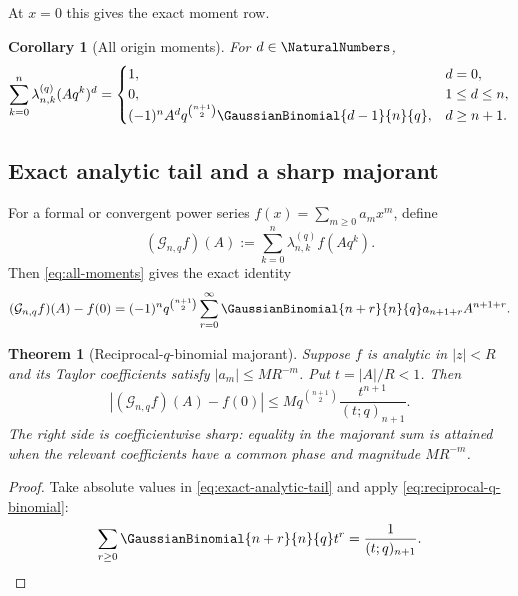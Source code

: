 \documentclass[11pt,oneside]{article}
\numberwithin{equation}{section}
\newtheorem{theorem}{Theorem}[section]
\newtheorem{corollary}[corollary]{Corollary}
\theoremstyle{definition}
\theoremstyle{remark}
\newcommand{\Gc}{\mathcal G}
\begin{document}
At $x=0$ this gives the exact moment row.

\begin{corollary}[All origin moments]
For $d\in\NaturalNumbers$,
\begin{equation}
 \sum_{k=0}^n\lambda_{n,k}^{(q)}(Aq^k)^d
 =\begin{cases}
  1,&d=0,\\
  0,&1\le d\le n,\\
  (-1)^nA^dq^{\binom{n+1}{2}}
  \GaussianBinomial{d-1}{n}{q},&d\ge n+1.
 \end{cases}
 \label{eq:all-moments}
\end{equation}
\end{corollary}

\subsection{Exact analytic tail and a sharp majorant}

For a formal or convergent power series $f(x)=\sum_{m\ge0}a_mx^m$, define
\begin{equation}
 (\Gc_{n,q}f)(A):=\sum_{k=0}^n\lambda_{n,k}^{(q)}f(Aq^k).
 \label{eq:G-definition}
\end{equation}
Then \eqref{eq:all-moments} gives the exact identity
\begin{equation}
 (\Gc_{n,q}f)(A)-f(0)
 =(-1)^nq^{\binom{n+1}{2}}
  \sum_{r=0}^{\infty}\GaussianBinomial{n+r}{n}{q}a_{n+1+r}A^{n+1+r}.
 \label{eq:exact-analytic-tail}
\end{equation}

\begin{theorem}[Reciprocal-$q$-binomial majorant]
Suppose $f$ is analytic in $|z|<R$ and its Taylor coefficients satisfy
$|a_m|\le MR^{-m}$.  Put $t=|A|/R<1$.  Then
\begin{equation}
 \left|(\Gc_{n,q}f)(A)-f(0)\right|
 \le M q^{\binom{n+1}{2}}
 \frac{t^{n+1}}{(t;q)_{n+1}}.
 \label{eq:sharp-majorant}
\end{equation}
The right side is coefficientwise sharp: equality in the majorant sum is
attained when the relevant coefficients have a common phase and magnitude
$MR^{-m}$.
\end{theorem}

\begin{proof}
Take absolute values in \eqref{eq:exact-analytic-tail} and apply
\eqref{eq:reciprocal-q-binomial}:
\[
 \sum_{r\ge0}\GaussianBinomial{n+r}{n}{q}t^r=\frac1{(t;q)_{n+1}}.
\]
\end{proof}
\end{document}
